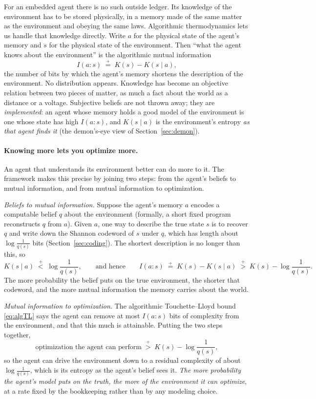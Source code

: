 \documentclass[10pt]{article}
\theoremstyle{definition}
\theoremstyle{remark}
\newcommand{\plt}{\mathrel{\stackrel{+}{<}}}
\newcommand{\pgt}{\mathrel{\stackrel{+}{>}}}
\newcommand{\peq}{\mathrel{\stackrel{+}{=}}}
\begin{document}
For an embedded agent there is no such outside ledger. Its knowledge of the environment has to be stored physically, in a memory made of the same matter as the environment and obeying the same laws. Algorithmic thermodynamics lets us handle that knowledge directly. Write $a$ for the physical state of the agent's memory and $s$ for the physical state of the environment. Then ``what the agent knows about the environment'' is the algorithmic mutual information
\[
I(a : s) \;\peq\; K(s) - K(s \mid a),
\]
the number of bits by which the agent's memory shortens the description of the environment. No distribution appears. Knowledge has become an objective relation between two pieces of matter, as much a fact about the world as a distance or a voltage. Subjective beliefs are not thrown away; they are \emph{implemented}: an agent whose memory holds a good model of the environment is one whose state has high $I(a:s)$, and $K(s \mid a)$ is the environment's entropy \emph{as that agent finds it} (the demon's-eye view of Section~\ref{sec:demon}).

\paragraph{Knowing more lets you optimize more.} An agent that understands its environment better can do more to it. The framework makes this precise by joining two steps: from the agent's beliefs to mutual information, and from mutual information to optimization.

\emph{Beliefs to mutual information.} Suppose the agent's memory $a$ encodes a computable belief $q$ about the environment (formally, a short fixed program reconstructs $q$ from $a$). Given $a$, one way to describe the true state $s$ is to recover $q$ and write down the Shannon codeword of $s$ under $q$, which has length about $\log \tfrac{1}{q(s)}$ bits (Section~\ref{sec:coding}). The shortest description is no longer than this, so
\[
K(s \mid a) \;\plt\; \log \frac{1}{q(s)},
\qquad\text{and hence}\qquad
I(a : s) \;\peq\; K(s) - K(s \mid a) \;\pgt\; K(s) - \log \frac{1}{q(s)}.
\]
The more probability the belief puts on the true environment, the shorter that codeword, and the more mutual information the memory carries about the world.

\emph{Mutual information to optimization.} The algorithmic Touchette--Lloyd bound \eqref{eq:algTL} says the agent can remove at most $I(a:s)$ bits of complexity from the environment, and that this much is attainable. Putting the two steps together,
\[
\text{optimization the agent can perform} \;\pgt\; K(s) - \log \frac{1}{q(s)},
\]
so the agent can drive the environment down to a residual complexity of about $\log\tfrac{1}{q(s)}$, which is its entropy as the agent's belief sees it. \emph{The more probability the agent's model puts on the truth, the more of the environment it can optimize}, at a rate fixed by the bookkeeping rather than by any modeling choice.
\end{document}
